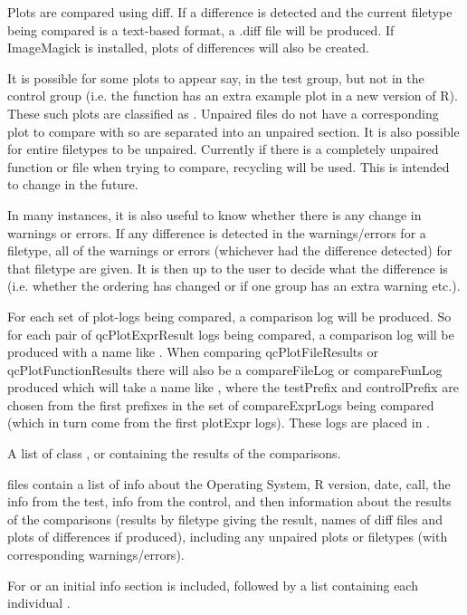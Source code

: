 \documentclass[a4paper,oneside]{book}
\begin{document}
\begin{Details}\relax
Plots are compared using  diff. If a difference is
detected and the current filetype being compared is a text-based
format, a .diff file will be produced. If ImageMagick is installed,
plots of differences will also be created.

It is possible for some plots to appear say, in the test group, but
not in the control group (i.e. the function  has an extra
example plot in a new version of R). These such plots are classified
as . Unpaired files do not have a corresponding plot
to compare with so are separated into an unpaired section. It is also
possible for entire filetypes to be unpaired. Currently if there is a
completely unpaired function or file when trying to compare, recycling
will be used. This is intended to change in the future.

In many instances, it is also useful to know whether there is any
change in warnings or errors. If any difference is detected in the
warnings/errors for a filetype, all of the warnings or errors
(whichever had the difference detected) for that filetype are
given. It is then up to the user to decide what the difference is
(i.e. whether the ordering has changed or if one group has an extra
warning etc.).

For each set of plot-logs being compared, a comparison log will be
produced. So for each pair of qcPlotExprResult logs being compared, a
comparison log will be produced with a name like
. When comparing
qcPlotFileResults or qcPlotFunctionResults there will also be a
compareFileLog or compareFunLog produced which will take a name like
, where the
testPrefix and controlPrefix are chosen from the first prefixes in the
set of compareExprLogs being compared (which in turn come from the first
plotExpr logs). These logs are placed in .
\end{Details}
\begin{Value}
A list of class ,  or
 containing the results of the comparisons.

 files contain a list of info about the Operating
System, R version, date, call, the info from the test, info from the
control, and then information about the results of the comparisons
(results by filetype giving the result, names of diff files and plots of
differences if produced), including any unpaired plots or filetypes
(with corresponding warnings/errors).

For  or  an initial info
section is included, followed by a list containing each individual
.
\end{Value}
\end{document}
